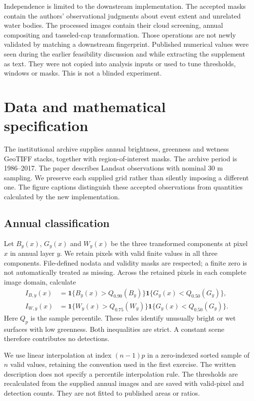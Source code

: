 \documentclass[11pt]{article}
\begin{document}
Independence is limited to the downstream implementation. The accepted masks
contain the authors' observational judgments about event extent and unrelated
water bodies. The processed images contain their cloud screening, annual
compositing and tasseled-cap transformation. Those operations are not newly
validated by matching a downstream fingerprint. Published numerical values
were seen during the earlier feasibility discussion and while extracting the
supplement as text. They were not copied into analysis inputs or used to tune
thresholds, windows or masks. This is not a blinded experiment.

\section{Data and mathematical specification}
The institutional archive supplies annual brightness, greenness and wetness
GeoTIFF stacks, together with region-of-interest masks. The archive period is
1986--2017. The paper describes Landsat observations with nominal 30 m sampling.
We preserve each supplied grid rather than silently imposing a different one.
The figure captions distinguish these accepted observations from quantities
calculated by the new implementation.

\subsection{Annual classification}
Let $B_y(x)$, $G_y(x)$ and $W_y(x)$ be the three transformed components at
pixel $x$ in annual layer $y$. We retain pixels with valid finite values in
all three components. File-defined nodata and validity masks are respected;
a finite zero is not automatically treated as missing. Across the retained
pixels in each complete image domain, calculate
\begin{align}
 I_{B,y}(x)&=\mathbf{1}\{B_y(x)>Q_{0.90}(B_y)\}
                  \mathbf{1}\{G_y(x)<Q_{0.50}(G_y)\},\\
 I_{W,y}(x)&=\mathbf{1}\{W_y(x)>Q_{0.75}(W_y)\}
                  \mathbf{1}\{G_y(x)<Q_{0.50}(G_y)\}.
\end{align}
Here $Q_p$ is the sample percentile. These rules identify unusually bright
or wet surfaces with low greenness. Both inequalities are strict. A constant
scene therefore contributes no detections.

We use linear interpolation at index $(n-1)p$ in a zero-indexed sorted sample
of $n$ valid values, retaining the convention used in the first exercise.
The written description does not specify a percentile interpolation rule.
The thresholds are recalculated from the supplied annual images and are
saved with valid-pixel and detection counts. They are not fitted to published
areas or ratios.
\end{document}
